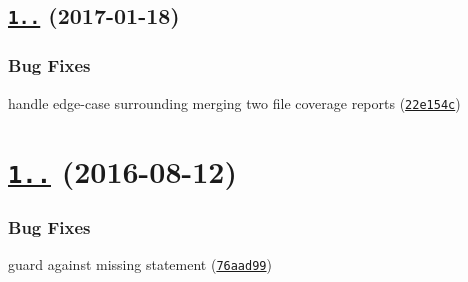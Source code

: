 \label{_1.0.1}%
 \subsection*{\href{https://github.com/istanbuljs/istanbul-lib-coverage/compare/v1.0.0...v1.0.1}{\tt 1..} (2017-\/01-\/18)}

\subsubsection*{Bug Fixes}


\begin{DoxyItemize}
\item handle edge-\/case surrounding merging two file coverage reports (\href{https://github.com/istanbuljs/istanbul-lib-coverage/commit/22e154c}{\tt 22e154c})
\end{DoxyItemize}

\label{_1.0.0}%
 \section*{\href{https://github.com/istanbuljs/istanbul-lib-coverage/compare/v1.0.0-alpha.3...v1.0.0}{\tt 1..} (2016-\/08-\/12)}

\subsubsection*{Bug Fixes}


\begin{DoxyItemize}
\item guard against missing statement (\href{https://github.com/istanbuljs/istanbul-lib-coverage/commit/76aad99}{\tt 76aad99}) 
\end{DoxyItemize}